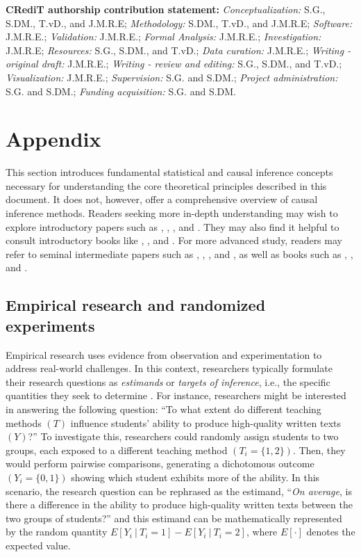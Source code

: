 \documentclass[
  authoryear,
  review,
  1p]{elsarticle}
\begin{document}
\textbf{CRediT authorship contribution statement:}
\emph{Conceptualization:} S.G., S.DM., T.vD., and J.M.R.E;
\emph{Methodology:} S.DM., T.vD., and J.M.R.E; \emph{Software:}
J.M.R.E.; \emph{Validation:} J.M.R.E.; \emph{Formal Analysis:} J.M.R.E.;
\emph{Investigation:} J.M.R.E; \emph{Resources:} S.G., S.DM., and T.vD.;
\emph{Data curation:} J.M.R.E.; \emph{Writing - original draft:}
J.M.R.E.; \emph{Writing - review and editing:} S.G., S.DM., and T.vD.;
\emph{Visualization:} J.M.R.E.; \emph{Supervision:} S.G. and S.DM.;
\emph{Project administration:} S.G. and S.DM.; \emph{Funding
acquisition:} S.G. and S.DM.

\newpage{}

\section{Appendix}\label{sec-appendix}

This section introduces fundamental statistical and causal inference
concepts necessary for understanding the core theoretical principles
described in this document. It does not, however, offer a comprehensive
overview of causal inference methods. Readers seeking more in-depth
understanding may wish to explore introductory papers such as
\citet{Pearl_2010}, \citet{Rohrer_2018}, \citet{Pearl_2019}, and
\citet{Cinelli_et_al_2020}. They may also find it helpful to consult
introductory books like \citet{Pearl_et_al_2018}, \citet{Neal_2020}, and
\citet{McElreath_2020}. For more advanced study, readers may refer to
seminal intermediate papers such as \citet{Neyman_et_al_1923},
\citet{Rubin_1974}, \citet{Spirtes_et_al_1991}, and \citet{Sekhon_2009},
as well as books such as \citet{Pearl_2009}, \citet{Morgan_et_al_2014},
and \citet{Hernan_et_al_2020}.

\subsection{Empirical research and randomized
experiments}\label{sec-appendix-A}

Empirical research uses evidence from observation and experimentation to
address real-world challenges. In this context, researchers typically
formulate their research questions as \emph{estimands} or \emph{targets
of inference}, i.e., the specific quantities they seek to determine
\citep{Everitt_et_al_2010}. For instance, researchers might be
interested in answering the following question: ``To what extent do
different teaching methods \((T)\) influence students' ability to
produce high-quality written texts \((Y)\)?'' To investigate this,
researchers could randomly assign students to two groups, each exposed
to a different teaching method \((T_{i} = \{1,2\})\). Then, they would
perform pairwise comparisons, generating a dichotomous outcome
\((Y_{i} = \{0,1\})\) showing which student exhibits more of the
ability. In this scenario, the research question can be rephrased as the
estimand, ``\emph{On average}, is there a difference in the ability to
produce high-quality written texts between the two groups of students?''
and this estimand can be mathematically represented by the random
quantity \(E[Y_{i} \: | \: T_{i}=1] - E[Y_{i} \: | \: T_{i}=2]\), where
\(E[\cdot]\) denotes the expected value.
\end{document}
